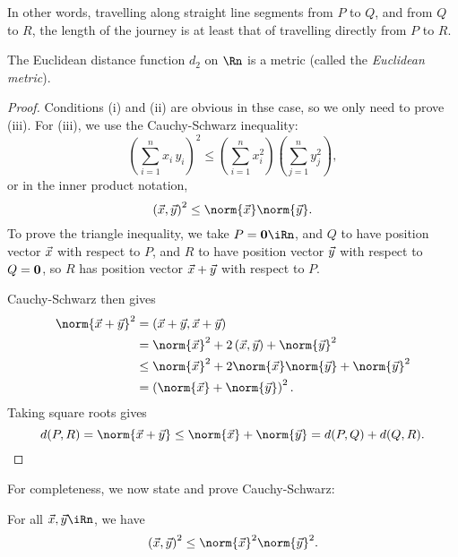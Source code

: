 In other words, travelling along straight line segments from $P$ to $Q$, and from $Q$ to $R$, the length of the journey is at least that of travelling directly from $P$ to $R$.

\begin{proposition}
	The Euclidean distance function $d_2$ on $\Rn$ is a metric (called the \emph{Euclidean metric}). %
\end{proposition}

\begin{proof}
	Conditions (i) and (ii) are obvious in thse case, so we only need to prove (iii). For (iii), we use the Cauchy-Schwarz inequality: %
	\begin{equation*}
		\left( \sum_{i=1}^n x_i \, y_i \right)^2 \leq \left( \sum_{i=1}^n x_i^2 \right) \left( \sum_{j=1}^n y_j^2 \right), %
	\end{equation*}
	or in the inner product notation,
	\begin{equation*}
		\left( \xx,\yy \right)^2 \leq \norm{\xx} \norm{\yy}. %
	\end{equation*}
	To prove the triangle inequality, we take $P=\bf{0}\iRn$, and $Q$ to have position vector $\vec{x}$ with respect to $P$, and $R$ to have position vector $\vec{y}$ with respect to $Q=\bf{0}$, so $R$ has position vector $\vec{x}+\vec{y}$ with respect to $P$. %
	
	Cauchy-Schwarz then gives
	\begin{align*}
			\norm{\xx+\yy}^2
		 &= \left( \xx+\yy, \xx+\yy \right) \\
		 &= \norm{\xx}^2 + 2\left( \xx,\yy \right) + \norm{\yy}^2 \\ %
		 &\leq \norm{\xx}^2 + 2 \norm{\xx} \norm{\yy} + \norm{\yy}^2 \\ %
		 &= \left( \norm{\xx} + \norm{\yy} \right)^2.
	\end{align*}
	Taking square roots gives
	\begin{equation*}
		 d(P,R) = \norm{\xx+\yy} \leq \norm{\xx} + \norm{\yy} = d(P,Q) + d(Q,R). \qedhere %
	\end{equation*}
\end{proof}

For completeness, we now state and prove Cauchy-Schwarz:

\begin{lemma}
	 For all $\xx,\yy \iRn$, we have %
	\label{lem:cauchy-schwarz}
	\begin{equation*}
		\left( \xx,\yy \right)^2 \leq \norm{\xx}^2 \norm{\yy}^2. %
	\end{equation*}
\end{lemma}

